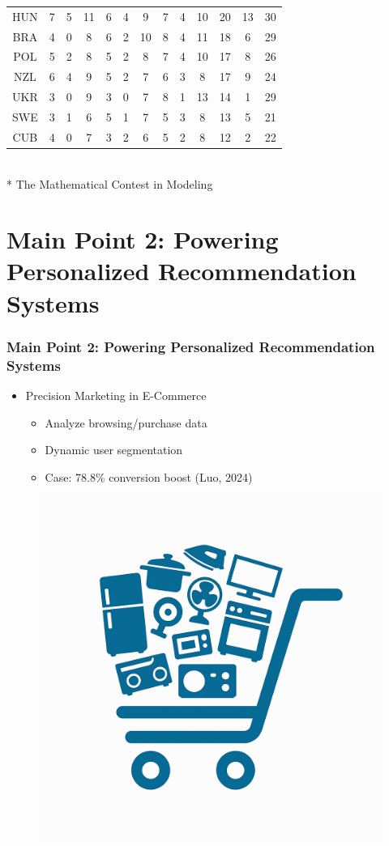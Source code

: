 \documentclass{beamer}
\begin{document}
\begin{frame}
\begin{minipage}{\textwidth}
\begin{tabular}{|c|c|c|c|c|c|c|c|c|c|c|c|c|}
        HUN & 7 & 5 & 11 & 6 & 4 & 9 & 7 & 4 & 10 & 20 & 13 & 30 \\
        BRA & 4 & 0 & 8 & 6 & 2 & 10 & 8 & 4 & 11 & 18 & 6 & 29 \\
        POL & 5 & 2 & 8 & 5 & 2 & 8 & 7 & 4 & 10 & 17 & 8 & 26 \\
        NZL & 6 & 4 & 9 & 5 & 2 & 7 & 6 & 3 & 8 & 17 & 9 & 24 \\
        UKR & 3 & 0 & 9 & 3 & 0 & 7 & 8 & 1 & 13 & 14 & 1 & 29 \\
        SWE & 3 & 1 & 6 & 5 & 1 & 7 & 5 & 3 & 8 & 13 & 5 & 21 \\
        CUB & 4 & 0 & 7 & 3 & 2 & 6 & 5 & 2 & 8 & 12 & 2 & 22 \\
\hline
\end{tabular}
\label{tab:medal_anticipation}
\raggedright
\\
* The Mathematical Contest in Modeling
\end{minipage}
\end{frame}


\section{Main Point 2: Powering Personalized Recommendation Systems}
\begin{frame}
 \frametitle{Main Point 2: Powering Personalized Recommendation Systems}
\begin{minipage}{\textwidth}
{\linespread{1.3}
\begin{itemize}
    \item {\Large Precision Marketing in E-Commerce}
    \begin{itemize}
        \item <1-> {\large Analyze browsing/purchase data}
        \item <2-> {\large Dynamic user segmentation}
        \item <3-> {\large Case: 78.8\% conversion boost} (Luo, 2024)
    \end{itemize}
\end{itemize}
}
\begin{figure}
    \centering
    \includegraphics[width=0.35\linewidth]{figure 9.png}
    \label{fig:enter-label}
\end{figure}
\end{minipage}
\end{frame}
\end{document}
